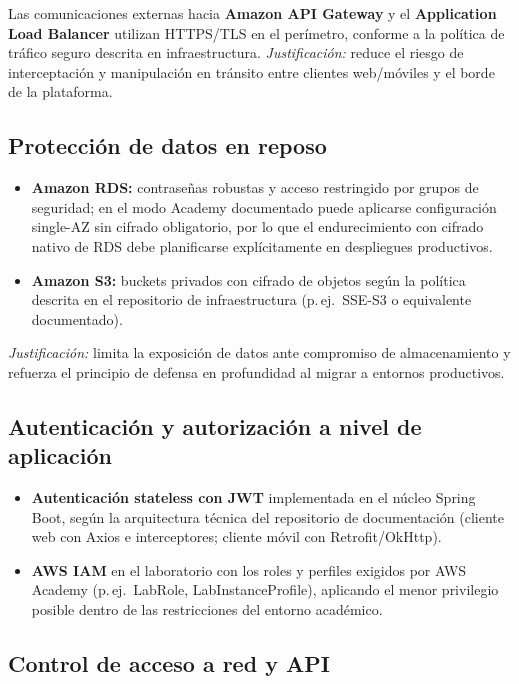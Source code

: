 \documentclass[12pt, letterpaper]{article}
\begin{document}
Las comunicaciones externas hacia \textbf{Amazon API Gateway} y el \textbf{Application Load Balancer} utilizan HTTPS/TLS en el perímetro, conforme a la política de tráfico seguro descrita en infraestructura. \textit{Justificación:} reduce el riesgo de interceptación y manipulación en tránsito entre clientes web/móviles y el borde de la plataforma.

\subsection{Protección de datos en reposo}

\begin{itemize}
\item \textbf{Amazon RDS:} contraseñas robustas y acceso restringido por grupos de seguridad; en el modo Academy documentado puede aplicarse configuración single-AZ sin cifrado obligatorio, por lo que el endurecimiento con cifrado nativo de RDS debe planificarse explícitamente en despliegues productivos.
\item \textbf{Amazon S3:} buckets privados con cifrado de objetos según la política descrita en el repositorio de infraestructura (p.\,ej.\ SSE-S3 o equivalente documentado).
\end{itemize}

\textit{Justificación:} limita la exposición de datos ante compromiso de almacenamiento y refuerza el principio de defensa en profundidad al migrar a entornos productivos.

\subsection{Autenticación y autorización a nivel de aplicación}

\begin{itemize}
\item \textbf{Autenticación stateless con JWT} implementada en el núcleo Spring Boot, según la arquitectura técnica del repositorio de documentación (cliente web con Axios e interceptores; cliente móvil con Retrofit/OkHttp).
\item \textbf{AWS IAM} en el laboratorio con los roles y perfiles exigidos por AWS Academy (p.\,ej.\ LabRole, LabInstanceProfile), aplicando el menor privilegio posible dentro de las restricciones del entorno académico.
\end{itemize}

\subsection{Control de acceso a red y API}
\end{document}
